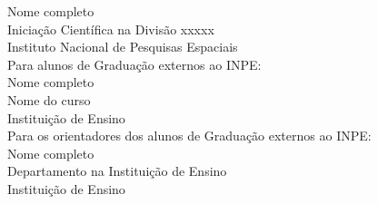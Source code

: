 \documentclass[12pt]{article}
\begin{document}
{	Nome completo\\
	Iniciação Científica na Divisão xxxxx\\
	Instituto Nacional de Pesquisas Espaciais\\
	Para alunos de Graduação externos ao INPE:\\
	Nome completo\\
	Nome do curso\\
	Instituição de Ensino\\
	Para os orientadores dos alunos de Graduação externos ao INPE:\\
	Nome completo\\
	Departamento na Instituição de Ensino\\
	Instituição de Ensino\\
}
\end{document}
